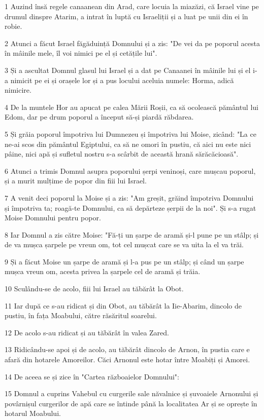 \par 1 Auzind însă regele canaanean din Arad, care locuia la miazăzi, că Israel vine pe drumul dinspre Atarim, a intrat în luptă cu Israeliții și a luat pe unii din ei în robie.
\par 2 Atunci a făcut Israel făgăduință Domnului și a zis: "De vei da pe poporul acesta în mâinile mele, îl voi nimici pe el și cetățile lui".
\par 3 Și a ascultat Domnul glasul lui Israel și a dat pe Canaanei în mâinile lui și el i-a nimicit pe ei și orașele lor și a pus locului aceluia numele: Horma, adică nimicire.
\par 4 De la muntele Hor au apucat pe calea Mării Roșii, ca să ocolească pământul lui Edom, dar pe drum poporul a început să-și piardă răbdarea.
\par 5 Și grăia poporul împotriva lui Dumnezeu și împotriva lui Moise, zicând: "La ce ne-ai scos din pământul Egiptului, ca să ne omori în pustiu, că aici nu este nici pâine, nici apă și sufletul nostru s-a scârbit de această hrană sărăcăcioasă".
\par 6 Atunci a trimis Domnul asupra poporului șerpi veninoși, care mușcau poporul, și a murit mulțime de popor din fiii lui Israel.
\par 7 A venit deci poporul la Moise și a zis: "Am greșit, grăind împotriva Domnului și împotriva ta; roagă-te Domnului, ca să depărteze șerpii de la noi". Și s-a rugat Moise Domnului pentru popor.
\par 8 Iar Domnul a zis către Moise: "Fă-ți un șarpe de aramă și-l pune pe un stâlp; și de va mușca șarpele pe vreun om, tot cel mușcat care se va uita la el va trăi.
\par 9 Și a făcut Moise un șarpe de aramă și l-a pus pe un stâlp; și când un șarpe mușca vreun om, acesta privea la șarpele cel de aramă și trăia.
\par 10 Sculându-se de acolo, fiii lui Israel au tăbărât la Obot.
\par 11 Iar după ce s-au ridicat și din Obot, au tăbărât la Iie-Abarim, dincolo de pustiu, în fața Moabului, către răsăritul soarelui.
\par 12 De acolo s-au ridicat și au tăbărât în valea Zared.
\par 13 Ridicându-se apoi și de acolo, au tăbărât dincolo de Arnon, în pustia care e afară din hotarele Amoreilor. Căci Arnonul este hotar între Moabiți și Amorei.
\par 14 De aceea se și zice în "Cartea războaielor Domnului":
\par 15 Domnul a cuprins Vahebul cu curgerile sale năvalnice și șuvoaiele Arnonului și povârnișul curgerilor de apă care se întinde până la localitatea Ar și se oprește în hotarul Moabului.
